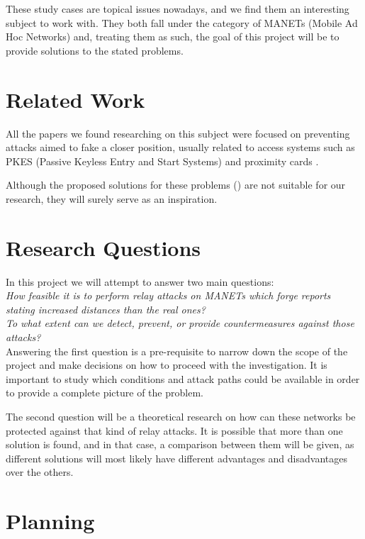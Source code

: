 \documentclass{article}
\begin{document}
These study cases are topical issues nowadays, and we find them an interesting subject to work with. They both fall under the category of MANETs (Mobile Ad Hoc Networks) and, treating them as such, the goal of this project will be to provide solutions to the stated problems.

\section{Related Work}

All the papers we found researching on this subject were focused on preventing attacks aimed to fake a closer position, usually related to access systems such as PKES (Passive Keyless Entry and Start Systems) \cite{francillon2011relay} and proximity cards \cite{hancke2005practical}.

Although the proposed solutions for these problems (\cite{brands1994distance, rasmussen2010realization}) are not suitable for our research, they will surely serve as an inspiration.


\section{Research Questions}

In this project we will attempt to answer two main questions:\\

\emph{How feasible it is to perform relay attacks on MANETs which forge reports stating increased distances than the real ones?}\\

\emph{To what extent can we detect, prevent, or provide countermeasures against those attacks?}\\

Answering the first question is a pre-requisite to narrow down the scope of the project and make decisions on how to proceed with the investigation. It is important to study which conditions and attack paths could be available in order to provide a complete picture of the problem.

The second question will be a theoretical research on how can these networks be protected against that kind of relay attacks. It is possible that more than one solution is found, and in that case, a comparison between them will be given, as different solutions will most likely have different advantages and disadvantages over the others.


\section{Planning}
\end{document}
